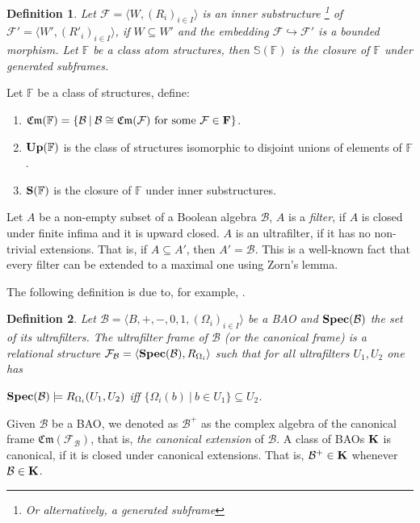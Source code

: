 \documentclass[a4paper]{article}
\theoremstyle{defin}
\newtheorem{defin}{Definition}
\theoremstyle{theorem}
\theoremstyle{claim}
\theoremstyle{prop}
\theoremstyle{lemma}
\theoremstyle{fact}
\theoremstyle{ex}
\theoremstyle{col}
\begin{document}
\begin{defin} Let $\mathcal{F} = \langle W, (R_{i})_{i \in I} \rangle$ is an inner substructure \footnote{Or alternatively, a generated subframe} of $\mathcal{F}' = \langle W', ({R'}_{i})_{i \in I} \rangle$, if $W \subseteq W'$ and the embedding $\mathcal{F} \hookrightarrow \mathcal{F}'$ is a bounded morphism. Let $\mathbb{F}$ be a class atom structures, then $\mathbb{S}(\mathbb{F})$ is the closure of $\mathbb{F}$ under generated subframes.
\end{defin}

Let $\mathbb{F}$ be a class of structures, define:
\begin{enumerate}
\item $\mathfrak{Cm}(\mathbb{F}) = \{ \mathcal{B} \: | \: \mathcal{B} \cong \mathfrak{Cm}(\mathcal{F}) \text{ for some $\mathcal{F} \in {\bf F}$}\}$.
\item ${\bf Up}(\mathbb{F})$ is the class of structures isomorphic to disjoint unions of elements of $\mathbb{F}$.
\item ${\bf S}(\mathbb{F})$ is the closure of $\mathbb{F}$ under inner substructures.
\end{enumerate}

Let $A$ be a non-empty subset of a Boolean algebra $\mathcal{B}$, $A$ is a \emph{filter}, if $A$ is closed under finite infima and it is upward closed. $A$ is an ultrafilter, if it has no non-trivial extensions. That is, if $A \subseteq A'$, then $A' = \mathcal{B}$. This is a well-known fact that every filter can be extended to a maximal one using Zorn's lemma.

The following definition is due to, for example, \cite[Definition 5.40]{venema2010}.

\begin{defin}
  Let $\mathcal{B} = \langle B, +, -, 0, 1, (\Omega_i)_{i \in I} \rangle$ be a BAO and ${\bf Spec}(\mathcal{B})$ the set of its ultrafilters. The ultrafilter frame of $\mathcal{B}$ (or the canonical frame) is a relational structure $\mathcal{F}_{\mathcal{B}} = \langle {\bf Spec}(\mathcal{B}), R_{\Omega_i} \rangle$ such that for all ultrafilters $U_1, U_2$ one has
  \begin{center}
    ${\bf Spec}(\mathcal{B}) \models R_{\Omega_i}(U_1, U_2)$ iff $\{ \Omega_i(b) \: | \: b \in U_1 \} \subseteq U_2$.
  \end{center}
\end{defin}

Given $\mathcal{B}$ be a BAO, we denoted as $\mathcal{B}^{+}$ as the complex algebra of the canonical frame $\mathfrak{Cm}(\mathcal{F}_{\mathcal{B}})$, that is, \emph{the canonical extension} of $\mathcal{B}$.
A class of BAOs ${\bf K}$ is canonical, if it is closed under canonical extensions. That is, $\mathcal{B}^{+} \in {\bf K}$ whenever $\mathcal{B} \in {\bf K}$.
\end{document}

